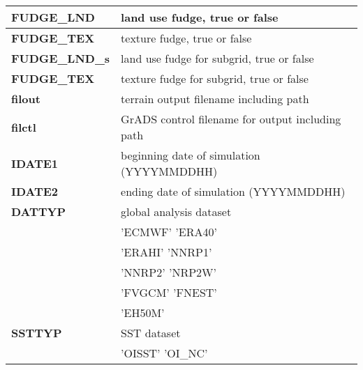 \begin{table}[h]
\begin{center}
\begin{tabular}{|l|l|}
{\footnotesize {\bf FUDGE\_LND}}   & {\footnotesize land use fudge, true or false} \\ \hline
{\footnotesize {\bf FUDGE\_TEX}}   & {\footnotesize texture fudge, true or false} \\ \hline
{\footnotesize {\bf FUDGE\_LND\_s}} & {\footnotesize land use fudge for subgrid, true or false} \\ \hline
{\footnotesize {\bf FUDGE\_TEX}}   & {\footnotesize texture fudge for subgrid, true or false} \\ \hline
{\footnotesize {\bf filout}}   & {\footnotesize terrain output filename including path} \\ \hline
{\footnotesize {\bf filctl}}   & {\footnotesize GrADS control filename for output including path} \\ \hline
{\footnotesize {\bf IDATE1}}   & {\footnotesize beginning date of simulation (YYYYMMDDHH)} \\ \hline
{\footnotesize {\bf IDATE2}}   & {\footnotesize ending date of simulation (YYYYMMDDHH)} \\ \hline
{\footnotesize {\bf DATTYP}}   & {\footnotesize global analysis dataset} \\ 
 &  \vspace{-0.15 cm} \hspace{0.5 cm} {\footnotesize 'ECMWF'} \hspace{0.5 cm} {\footnotesize 'ERA40'}\\
 &  \vspace{-0.15 cm} \hspace{0.5 cm} {\footnotesize 'ERAHI'} \hspace{0.5 cm} {\footnotesize 'NNRP1'}\\
 &  \vspace{-0.15 cm} \hspace{0.5 cm} {\footnotesize 'NNRP2'} \hspace{0.5 cm} {\footnotesize 'NRP2W'}\\
 &  \vspace{-0.15 cm} \hspace{0.5 cm} {\footnotesize 'FVGCM'} \hspace{0.5 cm} {\footnotesize 'FNEST'}\\
 &  \vspace{-0.15 cm} \hspace{0.5 cm} {\footnotesize 'EH50M'}\\
\hline
{\footnotesize {\bf SSTTYP}}  & {\footnotesize SST dataset } \\ 
 &  \vspace{-0.15 cm} \hspace{0.5 cm} {\footnotesize 'OISST'} \hspace{0.5 cm} {\footnotesize 'OI\_NC'}\\

\end{tabular}
\end{center}
\end{table}
